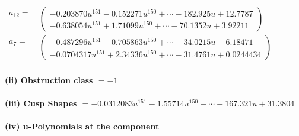 \documentclass[1p]{elsarticle_modified}
\theoremstyle{definition}
\begin{document}
\begin{tabular}{m{7pt} m{180pt} m{7pt} m{180pt} }
\flushright $a_{12}=$&$\begin{pmatrix}-0.203870 u^{151}-0.152271 u^{150}+\cdots-182.925 u+12.7787\\-0.638054 u^{151}+1.71099 u^{150}+\cdots-70.1352 u+3.92211\end{pmatrix}$ \\
\flushright $a_{7}=$&$\begin{pmatrix}-0.487296 u^{151}-0.705863 u^{150}+\cdots-34.0215 u-6.18471\\-0.0704317 u^{151}+2.34336 u^{150}+\cdots-31.4761 u+0.0244434\end{pmatrix}$\\&\end{tabular}
\flushleft \textbf{(ii) Obstruction class $= -1$}\\~\\
\flushleft \textbf{(iii) Cusp Shapes $= -0.0312083 u^{151}-1.55714 u^{150}+\cdots-167.321 u+31.3804$}\\~\\
\newpage\renewcommand{\arraystretch}{1}
\flushleft \textbf{(iv) u-Polynomials at the component}\newline \\
\end{document}
